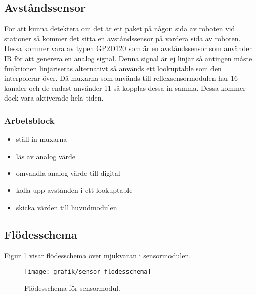 \subsection{Avståndssensor}
För att kunna detektera om det är ett paket på någon sida av roboten vid stationer så kommer det sitta en avståndssensor på vardera sida av roboten. Dessa kommer vara av typen GP2D120 som är en avståndssensor som använder IR för att generera en analog signal. Denna signal är ej linjär så antingen måste funktionen linjäriseras alternativt så används ett lookuptable som den interpolerar över. Då muxarna som används till reflexsensormodulen har 16 kanaler och de endast använder 11 så kopplas dessa in samma. Dessa kommer dock vara aktiverade hela tiden.
\subsubsection{Arbetsblock}
\begin{itemize}
\item ställ in muxarna
\item läs av analog värde
\item omvandla analog värde till digital
\item kolla upp avstånden i ett lookuptable
\item skicka värden till huvudmodulen
\end{itemize}

\newpage
\subsection{Flödesschema}
Figur \ref{systemskiss:sensorschema} visar flödesschema över mjukvaran i sensormodulen.


\begin{figure}[h]
\center
\texttt{[image: grafik/sensor-flodesschema]}
\caption{Flödesschema för sensormodul.} \label{systemskiss:sensorschema}
\end{figure}

%
